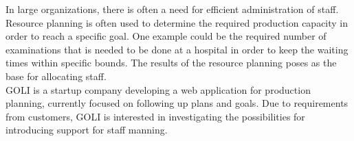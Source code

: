 
In large organizations, there is often a need for efficient
administration of staff. Resource planning is often used to determine
the required production capacity in order to reach a specific goal. One
example could be the required number of examinations that is needed to
be done at a hospital in order to keep the waiting times within specific
bounds. The results of the resource planning poses as the base for
allocating staff.\\

GOLI is a startup company developing a web application for production
planning, currently focused on following up plans and goals.
Due to requirements from customers, GOLI is interested in investigating the
possibilities for introducing support for staff manning.\\


